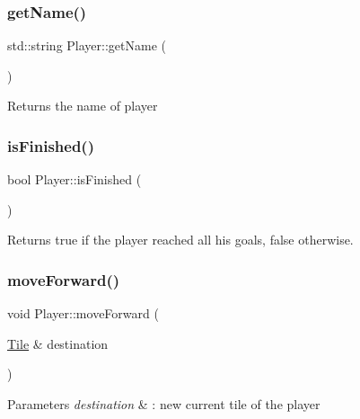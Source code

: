 \subsubsection{\texorpdfstring{getName()}{getName()}}
{\footnotesize\ttfamily std\+::string Player\+::get\+Name (\begin{DoxyParamCaption}{ }\end{DoxyParamCaption})}

\begin{DoxyReturn}{Returns}
the name of player 
\end{DoxyReturn}
\mbox{\label{classPlayer_addccad6110e3723c735ed69c0239cabe}} 
\subsubsection{\texorpdfstring{isFinished()}{isFinished()}}
{\footnotesize\ttfamily bool Player\+::is\+Finished (\begin{DoxyParamCaption}{ }\end{DoxyParamCaption})}

\begin{DoxyReturn}{Returns}
true if the player reached all his goals, false otherwise. 
\end{DoxyReturn}
\mbox{\label{classPlayer_a6c4732be91110899d5662ca9a1d76e4e}} 
\subsubsection{\texorpdfstring{moveForward()}{moveForward()}}
{\footnotesize\ttfamily void Player\+::move\+Forward (\begin{DoxyParamCaption}\item[{\mbox{\hyperlink{classTile}{Tile}} \&}]{destination }\end{DoxyParamCaption})}


\begin{DoxyParams}{Parameters}
{\em destination} & \+: new current tile of the player \\
\hline
\end{DoxyParams}
\mbox{\label{classPlayer_ab6b15b5ec31d724bfe33f7888d5d85fa}} 
